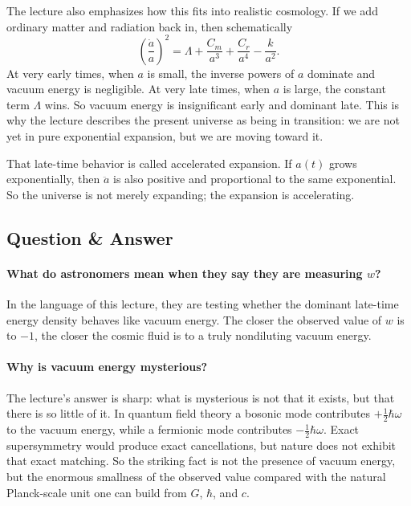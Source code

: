 The lecture also emphasizes how this fits into realistic cosmology. If we add ordinary matter and radiation back in, then schematically
\begin{equation}
\left(\frac{\dot a}{a}\right)^2
=
\Lambda+\frac{C_m}{a^3}+\frac{C_r}{a^4}-\frac{k}{a^2}.
\end{equation}
At very early times, when \(a\) is small, the inverse powers of \(a\) dominate and vacuum energy is negligible. At very late times, when \(a\) is large, the constant term \(\Lambda\) wins. So vacuum energy is insignificant early and dominant late. This is why the lecture describes the present universe as being in transition: we are not yet in pure exponential expansion, but we are moving toward it.

That late-time behavior is called accelerated expansion. If \(a(t)\) grows exponentially, then \(\ddot a\) is also positive and proportional to the same exponential. So the universe is not merely expanding; the expansion is accelerating.

\subsection{Question \& Answer}

\paragraph{What do astronomers mean when they say they are measuring \(w\)?} In the language of this lecture, they are testing whether the dominant late-time energy density behaves like vacuum energy. The closer the observed value of \(w\) is to \(-1\), the closer the cosmic fluid is to a truly nondiluting vacuum energy.

\paragraph{Why is vacuum energy mysterious?} The lecture's answer is sharp: what is mysterious is not that it exists, but that there is so little of it. In quantum field theory a bosonic mode contributes \(+\tfrac12\hbar\omega\) to the vacuum energy, while a fermionic mode contributes \(-\tfrac12\hbar\omega\). Exact supersymmetry would produce exact cancellations, but nature does not exhibit that exact matching. So the striking fact is not the presence of vacuum energy, but the enormous smallness of the observed value compared with the natural Planck-scale unit one can build from \(G\), \(\hbar\), and \(c\).

